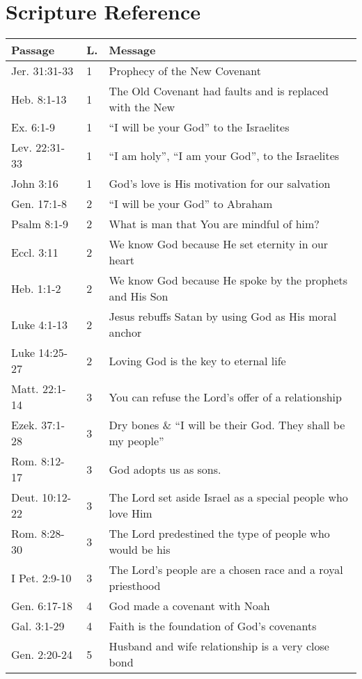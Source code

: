 \chapter{Scripture Reference}

\begin{table}[h]%
\centering
\begin{tabular}{llp{11cm}}
\toprule
Passage & L. & Message \\
\midrule
Jer. 31:31-33  & 1 & Prophecy of the New Covenant\\
Heb. 8:1-13    & 1 & The Old Covenant had faults and is replaced with the New\\
Ex. 6:1-9      & 1 & ``I will be your God'' to the Israelites\\
Lev. 22:31-33  & 1 & ``I am holy'', ``I am your God'', to the Israelites\\
John 3:16      & 1 & God's love is His motivation for our salvation\\
Gen. 17:1-8    & 2 & ``I will be your God'' to Abraham\\
Psalm 8:1-9    & 2 & What is man that You are mindful of him?\\
Eccl. 3:11     & 2 & We know God because He set eternity in our heart\\
Heb. 1:1-2     & 2 & We know God because He spoke by the prophets and His Son\\
Luke 4:1-13    & 2 & Jesus rebuffs Satan by using God as His moral anchor\\
Luke 14:25-27  & 2 & Loving God is the key to eternal life\\
Matt. 22:1-14  & 3 & You can refuse the Lord's offer of a relationship\\
Ezek. 37:1-28  & 3 & Dry bones \& ``I will be their God.  They shall be my people''\\
Rom. 8:12-17   & 3 & God adopts us as sons.\\
Deut. 10:12-22 & 3 & The Lord set aside Israel as a special people who love Him\\
Rom. 8:28-30   & 3 & The Lord predestined the type of people who would be his\\
I Pet. 2:9-10  & 3 & The Lord's people are a chosen race and a royal priesthood\\
Gen. 6:17-18   & 4 & God made a covenant with Noah \\
Gal. 3:1-29    & 4 & Faith is the foundation of God's covenants\\
Gen. 2:20-24   & 5 & Husband and wife relationship is a very close bond\\

\end{tabular}
\end{table}
